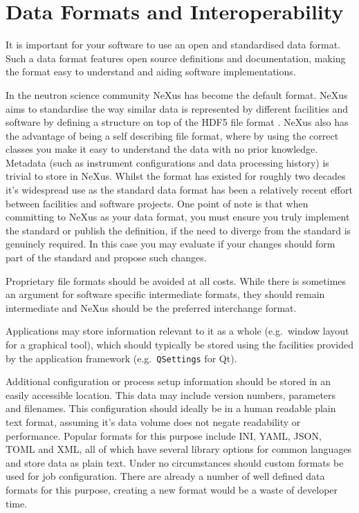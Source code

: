 \documentclass[jnr]{iosart2x}
\begin{document}
\section{Data Formats and Interoperability}
\label{Data Formats and Interoperability}

It is important for your software to use an open and standardised data format.
Such a data format features open source definitions and documentation, making the format easy to understand and aiding software implementations.

In the neutron science community NeXus \cite{K_nnecke_2015} has become the default format.
NeXus aims to standardise the way similar data is represented by different facilities and software by defining a structure on top of the HDF5 file format \cite{HDF5}.
NeXus also has the advantage of being a self describing file format, where by using the correct classes you make it easy to understand the data with no prior knowledge.
Metadata (such as instrument configurations and data processing history) is trivial to store in NeXus.
Whilst the format has existed for roughly two decades it's widespread use as the standard data format has been a relatively recent effort between facilities and software projects.
One point of note is that when committing to NeXus as your data format, you must ensure you truly implement the standard or publish the definition, if the need to diverge from the standard is genuinely required.
In this case you may evaluate if your changes should form part of the standard and propose such changes.

Proprietary file formats should be avoided at all costs.
While there is sometimes an argument for software specific intermediate formats, they should remain intermediate and NeXus should be the preferred interchange format.

Applications may store information relevant to it as a whole (e.g.\ window layout for a graphical tool), which should typically be stored using the facilities provided by the application framework (e.g.\ \texttt{QSettings} for Qt).

Additional configuration or process setup information should be stored in an easily accessible location.
This data may include version numbers, parameters and filenames.
This configuration should ideally be in a human readable plain text format, assuming it's data volume does not negate readability or performance.
Popular formats for this purpose include INI, YAML, JSON, TOML and XML, all of which have several library options for common languages and store data as plain text.
Under no circumstances should custom formats be used for job configuration.
There are already a number of well defined data formats for this purpose, creating a new format would be a waste of developer time.
\end{document}
